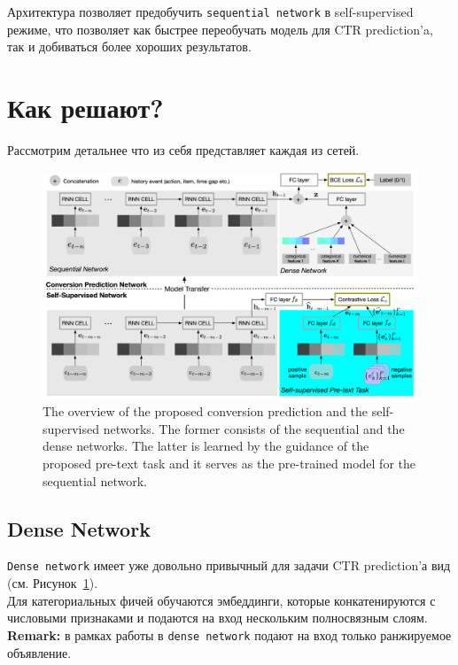 Архитектура позволяет предобучить \texttt{sequential network} в self-supervised режиме, что позволяет как быстрее переобучать модель для CTR prediction'a, так и добиваться более хороших результатов.

\section{Как решают?}

Рассмотрим детальнее что из себя представляет каждая из сетей. 

\begin{figure}[ht]
    \centering
    \includegraphics[width=1.0\linewidth]{images/pretraining.png}
    \caption{\small{The overview of the proposed conversion prediction and the self-supervised networks. The former consists of the sequential and the dense networks. The latter is learned by the guidance of the proposed pre-text task and it serves as the pre-trained model for the sequential network.}}
    \label{fig:pretrainig}
\end{figure}

\subsection{Dense Network}

\texttt{Dense network} имеет уже довольно привычный для задачи CTR prediction'а вид (см. Рисунок~\ref{fig:pretrainig}). \\

Для категориальных фичей обучаются эмбеддинги, которые конкатенируются с числовыми признаками и подаются на вход нескольким полносвязным слоям. \\

{\bf Remark:} в рамках работы в \texttt{dense network} подают на вход только ранжируемое объявление.

